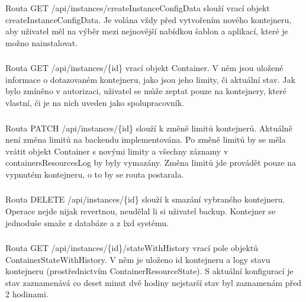 \documentclass[a4paper,oneside,12pt]{report}
\begin{document}
\subsubsection{\color{apiblue}{GET -- /api/instances/createInstanceConfigData}}

Routa GET /api/instances/createInstanceConfigData slouží vrací objekt createInstanceConfigData.
Je volána vždy před vytvořením nového kontejneru, aby uživatel měl na výběr mezi nejnovější nabídkou šablon a aplikací, které je možno nainstalovat.

\subsubsection{}

Routa GET /api/instances/\{id\} vrací objekt Container.
V něm jsou uložené informace o dotazovaném kontejneru, jako jsou jeho limity, či aktuální stav.
Jak bylo zmíněno v autorizaci, uživatel se může zeptat pouze na kontejnery, které vlastní, či je na nich uveden jako spolupracovník.

\subsubsection{}

Routa PATCH /api/instances/\{id\} slouží k změně limitů kontejnerů.
Aktuálně není změna limitů na backendu implementována.
Po změně limitů by se měla vrátit objekt Container s novými limity a všechny záznamy v containersResourcesLog by byly vymazány.
Změna limitů jde provádět pouze na vypnutém kontejneru, o to by se routa postarala.

\subsubsection{}

Routa DELETE /api/instances/\{id\} slouží k smazání vybraného kontejneru.
Operace nejde nijak revertnou, neudělal li si uživatel backup.
Kontejner se jednoduše smaže z databáze a z lxd systému.

\subsubsection{}

Routa GET /api/instances/\{id\}/stateWithHistory vrací pole objektů ContainerStateWithHistory.
V něm je uloženo id kontejneru a logy stavu kontejneru (prostřednictvím ContainerResourceState).
S aktuální konfigurací je stav zaznamenává co deset minut dvě hodiny nejstarší stav byl zaznamenám před 2 hodinami.
\end{document}
